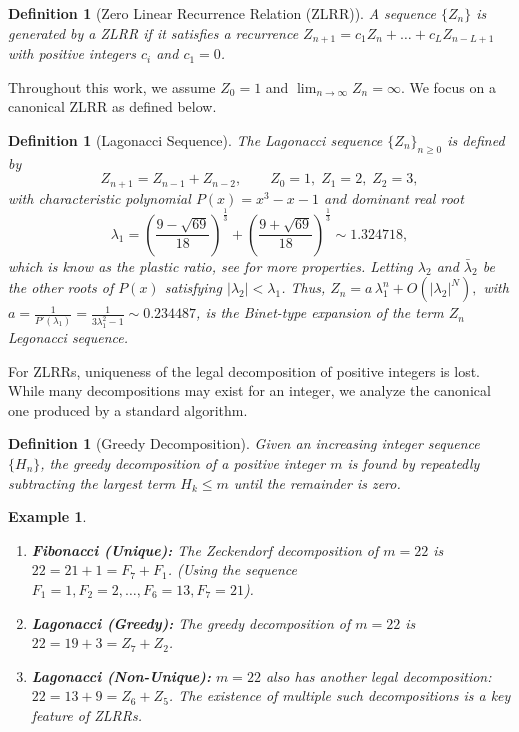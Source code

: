\documentclass[11pt]{amsart}
\theoremstyle{plain}
\numberwithin{equation}{section} %
\newtheorem{example}[thm]{Example}
\newtheorem{definition}[thm]{Definition}
\numberwithin{table}{section} %
\numberwithin{figure}{section}
\begin{document}
	\begin{definition}[Zero Linear Recurrence Relation (ZLRR)]
		A sequence $\{Z_n\}$ is generated by a \textit{ZLRR} if it satisfies a recurrence $Z_{n+1} = c_1 Z_n + \dots + c_L Z_{n-L+1}$ with positive integers $c_i$  and  $c_1 = 0$. 
	\end{definition}
	
	Throughout this work, we assume $Z_0=1$
	and $\lim_{n \rightarrow \infty} Z_n = \infty.$ We focus on a canonical ZLRR as defined below.
	
	\begin{definition}[Lagonacci Sequence]
		\label{Lagon}
		The \textit{Lagonacci sequence}  $\{Z_n\}_{n\ge0}$ is   defined by
		\[
		Z_{n+1}=Z_{n-1}+Z_{n-2}, \qquad Z_0=1,\; Z_1=2,\; Z_2=3,
		\]
		with characteristic polynomial $P(x)=x^3-x-1$ and dominant real root
		$$\lambda_1= \left( \frac{9-\sqrt{69}}{18}\right) ^{\frac{1}{3}} +
		\left( \frac{9+\sqrt{69}}{18}\right) ^{\frac{1}{3}} 
		\sim 1.324718,$$
		which is know as the {\it plastic ratio}, see \cite{Diskaya2021Plastic} for more properties.	
		Letting  $\lambda_2$ and ${\bar \lambda}_2$ be the other roots of $P(x)$ satisfying $|\lambda_2| < \lambda_1$. Thus,    $Z_n=   a\,\lambda_1^n + O(|\lambda_2|^N),$ 
		with $a=\frac{1}{P'(\lambda_1)}=\frac{1}{3\lambda_1^2-1} \sim 0.234487$, is  the Binet-type expansion of  the term  $Z_n$ Legonacci sequence. 
		
	\end{definition}
	
	
	
	
	
	For ZLRRs, uniqueness of the legal decomposition of positive integers is lost. While many decompositions may exist for an integer, we analyze the canonical one produced by a standard algorithm.
	
	\begin{definition}[Greedy Decomposition]
		Given an increasing integer sequence $\{H_n\}$, the \textit{greedy decomposition} of a positive integer $m$ is found by repeatedly subtracting the largest term $H_k \le m$ until the remainder is zero.
	\end{definition}
	
	
	\begin{example}
		\begin{enumerate}
			\item \textbf{Fibonacci (Unique):} The Zeckendorf decomposition of $m=22$ is $22 = 21 + 1 = F_7 + F_1$. (Using the sequence $F_1=1, F_2=2, \dots, F_6=13, F_7=21$).
			\item \textbf{Lagonacci (Greedy):} The greedy decomposition of $m=22$ is $22 = 19 + 3 = Z_7 + Z_2$.
			\item \textbf{Lagonacci (Non-Unique):} $m=22$ also has another legal decomposition: $22 = 13 + 9 = Z_6 + Z_5$. The existence of multiple such decompositions is a key feature of ZLRRs.
		\end{enumerate}
	\end{example}
	
\end{document}
